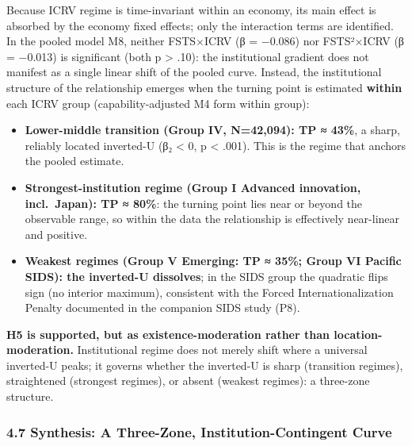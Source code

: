 \documentclass[
  12pt,a4paper]{article}
\providecommand{\tightlist}{%
  \setlength{\itemsep}{0pt}\setlength{\parskip}{0pt}}
\begin{document}
Because ICRV regime is time-invariant within an economy, its main effect
is absorbed by the economy fixed effects; only the interaction terms are
identified. In the pooled model M8, neither FSTS×ICRV (β = −0.086) nor
FSTS²×ICRV (β = −0.013) is significant (both p \textgreater{} .10): the
institutional gradient does not manifest as a single linear shift of the
pooled curve. Instead, the institutional structure of the relationship
emerges when the turning point is estimated \textbf{within} each ICRV
group (capability-adjusted M4 form within group):

\begin{itemize}
\tightlist
\item
  \textbf{Lower-middle transition (Group IV, N=42,094): TP ≈ 43\%}, a
  sharp, reliably located inverted-U (β₂ \textless{} 0, p \textless{}
  .001). This is the regime that anchors the pooled estimate.
\item
  \textbf{Strongest-institution regime (Group I Advanced innovation,
  incl.~Japan): TP ≈ 80\%}: the turning point lies near or beyond the
  observable range, so within the data the relationship is effectively
  near-linear and positive.
\item
  \textbf{Weakest regimes (Group V Emerging: TP ≈ 35\%; Group VI Pacific
  SIDS): the inverted-U dissolves}; in the SIDS group the quadratic
  flips sign (no interior maximum), consistent with the Forced
  Internationalization Penalty documented in the companion SIDS study
  (P8).
\end{itemize}

\textbf{H5 is supported, but as existence-moderation rather than
location-moderation.} Institutional regime does not merely shift where a
universal inverted-U peaks; it governs whether the inverted-U is sharp
(transition regimes), straightened (strongest regimes), or absent
(weakest regimes): a three-zone structure.

\hypertarget{synthesis-a-three-zone-institution-contingent-curve}{%
\subsubsection{4.7 Synthesis: A Three-Zone, Institution-Contingent
Curve}\label{synthesis-a-three-zone-institution-contingent-curve}}
\end{document}
